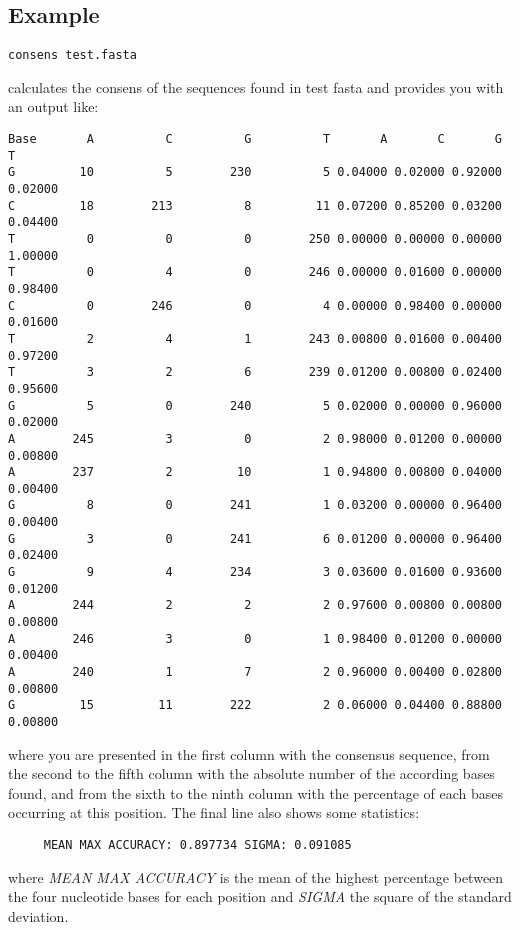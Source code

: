 \subsection{Example}
\begin{lstlisting}
consens test.fasta
\end{lstlisting}
calculates the consens of the sequences found in test fasta and
provides you with an output like:
\begin{lstlisting}
Base       A          C          G          T       A       C       G       T
G         10          5        230          5 0.04000 0.02000 0.92000 0.02000
C         18        213          8         11 0.07200 0.85200 0.03200 0.04400
T          0          0          0        250 0.00000 0.00000 0.00000 1.00000
T          0          4          0        246 0.00000 0.01600 0.00000 0.98400
C          0        246          0          4 0.00000 0.98400 0.00000 0.01600
T          2          4          1        243 0.00800 0.01600 0.00400 0.97200
T          3          2          6        239 0.01200 0.00800 0.02400 0.95600
G          5          0        240          5 0.02000 0.00000 0.96000 0.02000
A        245          3          0          2 0.98000 0.01200 0.00000 0.00800
A        237          2         10          1 0.94800 0.00800 0.04000 0.00400
G          8          0        241          1 0.03200 0.00000 0.96400 0.00400
G          3          0        241          6 0.01200 0.00000 0.96400 0.02400
G          9          4        234          3 0.03600 0.01600 0.93600 0.01200
A        244          2          2          2 0.97600 0.00800 0.00800 0.00800
A        246          3          0          1 0.98400 0.01200 0.00000 0.00400
A        240          1          7          2 0.96000 0.00400 0.02800 0.00800
G         15         11        222          2 0.06000 0.04400 0.88800 0.00800
\end{lstlisting}
where you are presented in the first column with the consensus
sequence, from the second to the fifth column with the absolute number
of the according bases found, and from the sixth to the ninth column
with the percentage of each bases occurring at this position.
The final line also shows some statistics:
\begin{lstlisting}
     MEAN MAX ACCURACY: 0.897734 SIGMA: 0.091085
\end{lstlisting}
where \emph{MEAN MAX ACCURACY} is the mean of the highest percentage
between the four nucleotide bases for each position and \emph{SIGMA} the
square of the standard deviation.


